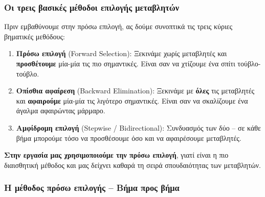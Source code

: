 \documentclass[12pt,a4paper]{article}
\begin{document}
\subsubsection{Οι τρεις βασικές μέθοδοι επιλογής μεταβλητών}

Πριν εμβαθύνουμε στην πρόσω επιλογή, ας δούμε συνοπτικά τις τρεις κύριες βηματικές μεθόδους:

\begin{theorybox}
\begin{enumerate}
    \item \textbf{Πρόσω επιλογή} (Forward Selection): Ξεκινάμε χωρίς μεταβλητές και \textbf{προσθέτουμε} μία-μία τις πιο σημαντικές. Είναι σαν να χτίζουμε ένα σπίτι τούβλο-τούβλο.

    \item \textbf{Οπίσθια αφαίρεση} (Backward Elimination): Ξεκινάμε με \textbf{όλες} τις μεταβλητές και \textbf{αφαιρούμε} μία-μία τις λιγότερο σημαντικές. Είναι σαν να σκαλίζουμε ένα άγαλμα αφαιρώντας μάρμαρο.

    \item \textbf{Αμφίδρομη επιλογή} (Stepwise / Bidirectional): Συνδυασμός των δύο -- σε κάθε βήμα μπορούμε τόσο να προσθέσουμε όσο και να αφαιρέσουμε μεταβλητές.
\end{enumerate}

\textbf{Στην εργασία μας χρησιμοποιούμε την πρόσω επιλογή}, γιατί είναι η πιο διαισθητική μέθοδος και μας δείχνει καθαρά τη σειρά σπουδαιότητας των μεταβλητών.
\end{theorybox}

\subsubsection{Η μέθοδος πρόσω επιλογής -- Βήμα προς βήμα}
\end{document}
